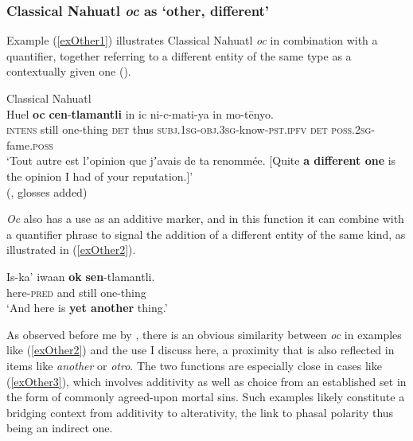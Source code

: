 \subsubsection{Classical Nahuatl \textit{oc} as \lq other, different\rq{}} Example (\ref{exOther1}) illustrates Classical Nahuatl \textit{oc} in combination with a quantifier, together referring to a different entity of the same  type as a contextually given one (). 
\begin{exe}
	\ex Classical Nahuatl\label{exOther1}\\
	\gll Huel \textbf{oc} \textbf{cen}-\textbf{tlamantli} in ic ni-c-mati-ya in mo-tēnyo.\\
	\textsc{intens} still one-thing \textsc{det} thus \textsc{subj}.1\textsc{sg}-\textsc{obj}.3\textsc{sg}-know-\textsc{pst}.\textsc{ipfv} \textsc{det} \textsc{poss}.2\textsc{sg}-fame.\textsc{poss}\\
	\glt \lq Tout autre est lʼopinion que jʼavais de ta renommée. [Quite \textbf{a different one} is the opinion I had of your reputation.]\rq
	\\(\cite[1266]{Launey1986}, glosses added)
\end{exe}

\textit{Oc} also has a use as an additive marker, and in this function it can combine with a quantifier phrase to signal the addition of a different entity of the same kind, as illustrated in (\ref{exOther2}).

\begin{exe}
	\ex\label{exOther2}
	\gll Is-ka' iwaan \textbf{ok} \textbf{sen}-tlamantli.\\
	here-\textsc{pred} and still one-thing\\
	\glt \lq And here is \textbf{yet another} thing.' \parencite[41]{Langacker1977}
\end{exe}

As observed before me by \textcite[1266]{Launey1986}, there is an obvious similarity between \textit{oc} in examples like (\ref{exOther2}) and the use I discuss here, a proximity that is also reflected in items like  \textit{another} or  \textit{otro}. The two functions are especially close in cases like (\ref{exOther3}), which involves additivity as well as choice from an established set in the form of commonly agreed-upon mortal sins. Such examples likely constitute a bridging context from additivity to alterativity, the link to phasal polarity thus being an indirect one.

